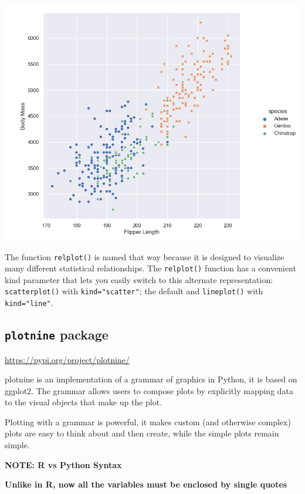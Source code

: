 \documentclass[
]{book}
\begin{document}
\begin{center}\includegraphics[width=0.9\linewidth]{fig/Viz_chap/2_seaborn} \end{center}

The function \texttt{relplot()} is named that way because it is designed to visualize many different statistical relationships. The \texttt{relplot()} function has a convenient kind parameter that lets you easily switch to this alternate representation:
\texttt{scatterplot()} with \texttt{kind="scatter"}; the default and \texttt{lineplot()} with \texttt{kind="line"}.

\hypertarget{plotnine-package}{%
\subsection{\texorpdfstring{\texttt{plotnine} package}{plotnine package}}\label{plotnine-package}}

\url{https://pypi.org/project/plotnine/}

plotnine is an implementation of a grammar of graphics in Python, it is based on ggplot2. The grammar allows users to compose plots by explicitly mapping data to the visual objects that make up the plot.

Plotting with a grammar is powerful, it makes custom (and otherwise complex) plots are easy to think about and then create, while the simple plots remain simple.

\textbf{NOTE: R vs Python Syntax}

\textbf{Unlike in R, now all the variables must be enclosed by single quotes}
\end{document}

